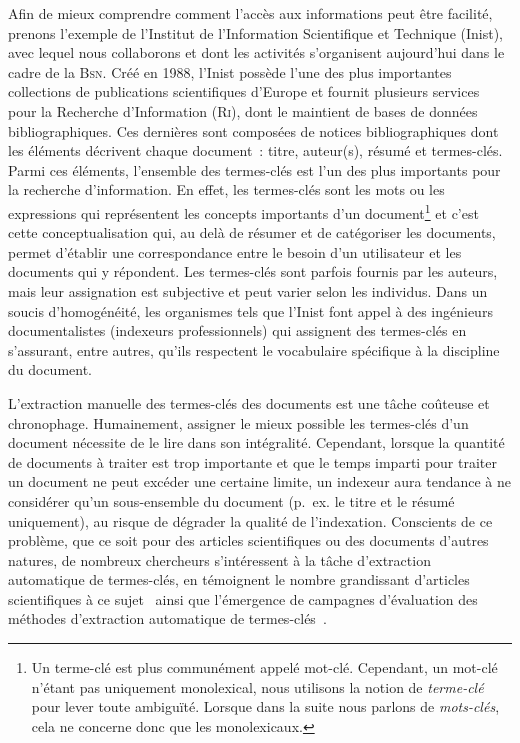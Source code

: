     Afin de mieux comprendre comment l'accès aux informations peut être
    facilité, prenons l'exemple de l'Institut de l'Information Scientifique et
    Technique (Inist), avec lequel nous collaborons et dont les activités
    s'organisent aujourd'hui dans le cadre de la \textsc{Bsn}. Créé en 1988,
    l'Inist possède l'une des plus importantes collections de publications
    scientifiques d'Europe et fournit plusieurs services pour la Recherche
    d'Information (\textsc{Ri}), dont le maintient de bases de données
    bibliographiques. Ces dernières sont composées de notices bibliographiques
    dont les éléments décrivent chaque document~: titre, auteur(s), résumé et
    termes-clés. Parmi ces éléments, l'ensemble des termes-clés est l'un des
    plus importants pour la recherche d'information. En effet, les termes-clés
    sont les mots ou les expressions qui représentent les concepts importants
    d'un document\footnote{Un terme-clé est plus communément appelé mot-clé.
    Cependant, un mot-clé n'étant pas uniquement monolexical, nous utilisons
    la notion de \textit{terme-clé} pour lever toute ambiguïté. Lorsque dans
    la suite nous parlons de \textit{mots-clés}, cela ne concerne donc que les
    monolexicaux.} et c'est cette conceptualisation qui, au delà de résumer et
    de catégoriser les documents, permet d'établir une correspondance entre le
    besoin d'un utilisateur et les documents qui y répondent. Les termes-clés
    sont parfois fournis par les auteurs, mais leur assignation est subjective
    et peut varier selon les individus. Dans un soucis d'homogénéité, les
    organismes tels que l'Inist font appel à des ingénieurs documentalistes
    (indexeurs professionnels) qui assignent des termes-clés en s'assurant,
    entre autres, qu'ils respectent le vocabulaire spécifique à la discipline
    du document.

    L'extraction manuelle des termes-clés des documents est une tâche coûteuse
    et chronophage. Humainement, assigner le mieux possible les termes-clés
    d'un document nécessite de le lire dans son intégralité. Cependant,
    lorsque la quantité de documents à traiter est trop importante et que le
    temps imparti pour traiter un document ne peut excéder une certaine
    limite, un indexeur aura tendance à ne considérer qu'un sous-ensemble du
    document (p.~ex. le titre et le résumé uniquement), au risque de dégrader
    la qualité de l'indexation.
    Conscients de ce problème, que ce soit pour des articles
    scientifiques ou des documents d'autres natures, de nombreux chercheurs
    s'intéressent à la tâche d'extraction automatique de termes-clés, en
    témoignent le nombre grandissant d'articles scientifiques à ce
    sujet~\cite{hasan2014state_of_the_art} ainsi que l'émergence de campagnes
    d'évaluation des méthodes d'extraction automatique de
    termes-clés~\cite{kim2010semeval,paroubek2012deft}.

